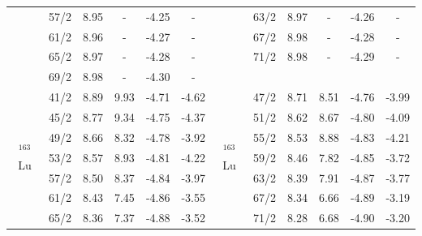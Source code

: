 \begin{table}
{\begin{tabular}{|c|c|c|c|c|c|c|ccccc|}
    \multicolumn{1}{|c|}{} & 57/2 & \multicolumn{1}{c|}{8.95} & - & \multicolumn{1}{c|}{-4.25} & - & \multicolumn{1}{c|}{} & \multicolumn{1}{c|}{63/2} & \multicolumn{1}{c|}{8.97} & \multicolumn{1}{c|}{-} & \multicolumn{1}{c|}{-4.26} & - \\ \cline{2-6} \cline{8-12} 
    \multicolumn{1}{|c|}{} & 61/2 & \multicolumn{1}{c|}{8.96} & - & \multicolumn{1}{c|}{-4.27} & - & \multicolumn{1}{c|}{} & \multicolumn{1}{c|}{67/2} & \multicolumn{1}{c|}{8.98} & \multicolumn{1}{c|}{-} & \multicolumn{1}{c|}{-4.28} & - \\ \cline{2-6} \cline{8-12} 
    \multicolumn{1}{|c|}{} & 65/2 & \multicolumn{1}{c|}{8.97} & - & \multicolumn{1}{c|}{-4.28} & - & \multicolumn{1}{c|}{} & \multicolumn{1}{c|}{71/2} & \multicolumn{1}{c|}{8.98} & \multicolumn{1}{c|}{-} & \multicolumn{1}{c|}{-4.29} & - \\ \cline{2-6} \cline{8-12} 
    \multicolumn{1}{|c|}{} & 69/2 & \multicolumn{1}{c|}{8.98} & - & \multicolumn{1}{c|}{-4.30} & - & \multicolumn{1}{c|}{} & \multicolumn{5}{c|}{} \\ \hline
    \multirow{8}{*}{$^{163}$Lu} & 41/2 & 8.89 & 9.93 & -4.71 & -4.62 & \multirow{8}{*}{$^{163}$Lu} & \multicolumn{1}{c|}{47/2} & \multicolumn{1}{c|}{8.71} & \multicolumn{1}{c|}{8.51} & \multicolumn{1}{c|}{-4.76} & -3.99 \\ \cline{2-6} \cline{8-12} 
    & 45/2 & 8.77 & 9.34 & -4.75 & -4.37 &  & \multicolumn{1}{c|}{51/2} & \multicolumn{1}{c|}{8.62} & \multicolumn{1}{c|}{8.67} & \multicolumn{1}{c|}{-4.80} & -4.09 \\ \cline{2-6} \cline{8-12} 
    & 49/2 & 8.66 & 8.32 & -4.78 & -3.92 &  & \multicolumn{1}{c|}{55/2} & \multicolumn{1}{c|}{8.53} & \multicolumn{1}{c|}{8.88} & \multicolumn{1}{c|}{-4.83} & -4.21 \\ \cline{2-6} \cline{8-12} 
    & 53/2 & 8.57 & 8.93 & -4.81 & -4.22 &  & \multicolumn{1}{c|}{59/2} & \multicolumn{1}{c|}{8.46} & \multicolumn{1}{c|}{7.82} & \multicolumn{1}{c|}{-4.85} & -3.72 \\ \cline{2-6} \cline{8-12} 
    & 57/2 & 8.50 & 8.37 & -4.84 & -3.97 &  & \multicolumn{1}{c|}{63/2} & \multicolumn{1}{c|}{8.39} & \multicolumn{1}{c|}{7.91} & \multicolumn{1}{c|}{-4.87} & -3.77 \\ \cline{2-6} \cline{8-12} 
    & 61/2 & 8.43 & 7.45 & -4.86 & -3.55 &  & \multicolumn{1}{c|}{67/2} & \multicolumn{1}{c|}{8.34} & \multicolumn{1}{c|}{6.66} & \multicolumn{1}{c|}{-4.89} & -3.19 \\ \cline{2-6} \cline{8-12} 
    & 65/2 & 8.36 & 7.37 & -4.88 & -3.52 &  & \multicolumn{1}{c|}{71/2} & \multicolumn{1}{c|}{8.28} & \multicolumn{1}{c|}{6.68} & \multicolumn{1}{c|}{-4.90} & -3.20 \\ \cline{2-6} \cline{8-12} 

\end{tabular}}
\end{table}
